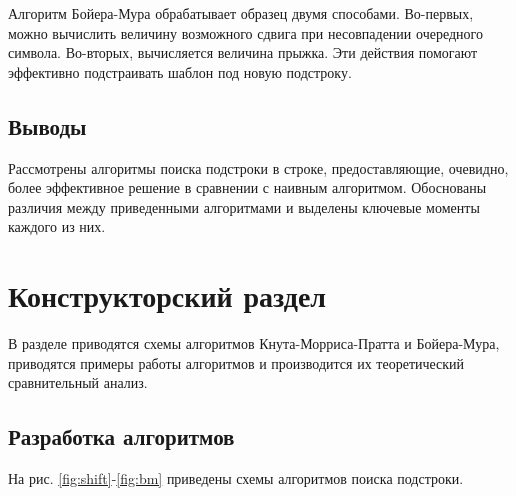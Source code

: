 \documentclass[a4paper,12pt]{article}
\begin{document}
Алгоритм Бойера-Мура обрабатывает образец двумя способами.
Во-первых, можно вычислить величину возможного сдвига при несовпадении
очередного символа.
Во-вторых, вычисляется величина
прыжка. Эти действия помогают эффективно подстраивать шаблон под новую подстроку.

\subsection*{Выводы}

Рассмотрены алгоритмы поиска подстроки в строке,
предоставляющие, очевидно, более эффективное решение в сравнении с наивным алгоритмом.
Обоснованы различия между приведенными алгоритмами и выделены ключевые моменты
каждого из них.

\newpage
\section{Конструкторский раздел}

В разделе приводятся схемы алгоритмов Кнута-Морриса-Пратта и Бойера-Мура, приводятся примеры работы алгоритмов и производится их теоретический сравнительный анализ.

\subsection{Разработка алгоритмов}

На рис. \ref{fig:shift}-\ref{fig:bm} приведены схемы 
алгоритмов поиска подстроки.
\end{document}
